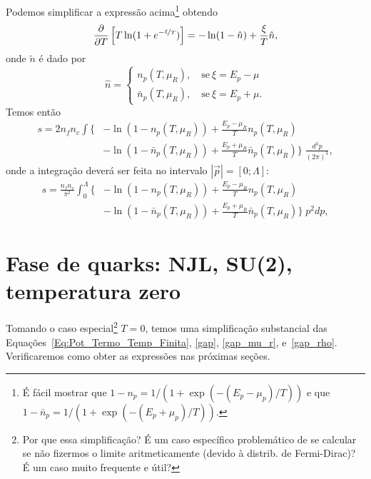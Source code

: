 Podemos simplificar a expressão acima\footnote{É fácil mostrar que $1 - n_p = 1/(1 + \exp(-(E_p - \mu_p)/T))$ e que $1 - \bar{n}_p = 1/(1 + \exp(-(E_p + \mu_p)/T))$.} obtendo
\begin{equation}
	\frac{\partial}{\partial T}\left[T \ln(1 + e^{-\nicefrac{\xi}{T}})\right] = - \ln(1-\hat{n}) + \frac{\xi}{T}\hat{n},
\end{equation}
%
onde $\tilde{n}$ é dado por
\begin{equation}
	\hat{n} = \begin{cases} n_p(T, \mu_R), \quad \textrm{se}~ \xi = E_p - \mu \\ \bar{n}_p(T, \mu_R), \quad \textrm{se}~ \xi = E_p + \mu. \end{cases}
\end{equation}
%
Temos então
\begin{equation}\label{Eq:Densidade_de_entropia_deriv_simplificada}
\begin{split}
	s = 2 n_f n_c \int \Big\{&-\ln(1 - n_p(T, \mu_R)) + \frac{E_p - \mu_R}{T} n_p(T, \mu_R) \\
	&- \ln (1 - \bar{n}_p(T, \mu_R)) + \frac{E_p + \mu_R}{T} \bar{n}_p(T, \mu_R)\Big\} \; \frac{d^3p}{(2\pi)^3},
\end{split}
\end{equation}
%
onde a integração deverá ser feita no intervalo $|\vec{p}| = [0;\Lambda]$:
\begin{equation}
\begin{split}
	s = \frac{n_f n_c}{\pi^2} \int_0^\Lambda \Big\{&-\ln(1 - n_p(T, \mu_R)) + \frac{E_p - \mu_R}{T} n_p(T, \mu_R) \\
	&- \ln (1 - \bar{n}_p(T, \mu_R)) + \frac{E_p + \mu_R}{T} \bar{n}_p(T, \mu_R)\Big\} \; p^2 dp,
\end{split}
\end{equation}

\section{Fase de quarks: NJL, SU(2), temperatura zero}

Tomando o caso especial\footnote{Por que essa simplificação? É um caso específico problemático de se calcular se não fizermos o limite aritmeticamente (devido à distrib. de Fermi-Dirac)? É um caso muito frequente e útil?} $T = 0$, temos uma simplificação substancial das Equações~\eqref{Eq:Pot_Termo_Temp_Finita}, \eqref{gap}, \eqref{gap_mu_r}, e~\eqref{gap_rho}. Verificaremos como obter as expressões nas próximas seções.

